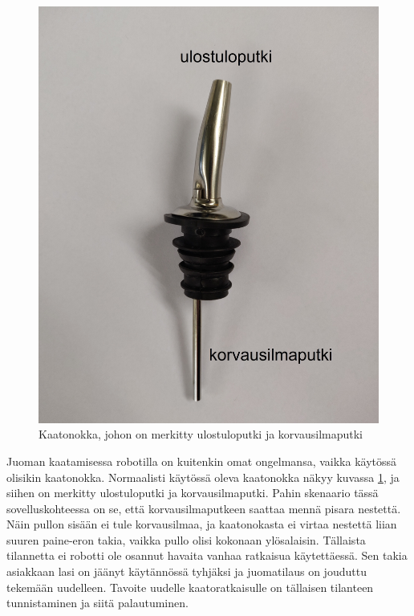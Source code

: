 \begin{figure}[h]
\begin{center}
\includegraphics[scale=0.07]{img/kaatonokka.jpg}
\caption{Kaatonokka, johon on merkitty ulostuloputki ja korvausilmaputki}
\label{fig:kaatonokka}
\end{center}
\end{figure}

Juoman kaatamisessa robotilla on kuitenkin omat ongelmansa, vaikka käytössä olisikin kaatonokka. Normaalisti käytössä oleva kaatonokka näkyy kuvassa \ref{fig:kaatonokka}, ja siihen on merkitty ulostuloputki ja korvausilmaputki. Pahin skenaario tässä sovelluskohteessa on se, että korvausilmaputkeen saattaa mennä pisara nestettä. Näin pullon sisään ei tule korvausilmaa, ja kaatonokasta ei virtaa nestettä liian suuren paine-eron takia, vaikka pullo olisi kokonaan ylösalaisin. Tällaista tilannetta ei robotti ole osannut havaita vanhaa ratkaisua käytettäessä. Sen takia asiakkaan lasi on jäänyt käytännössä tyhjäksi ja juomatilaus on jouduttu tekemään uudelleen. Tavoite uudelle kaatoratkaisulle on tällaisen tilanteen tunnistaminen ja siitä palautuminen.

